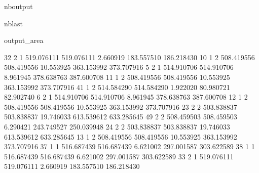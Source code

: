 \documentclass[letterpaper,10pt,english]{sphinxmanual}
\begin{document}
\begin{sphinxuseclass}{nboutput}
\begin{sphinxuseclass}{nblast}
{\begin{sphinxuseclass}{output_area}
\begin{sphinxuseclass}{}
\begin{sphinxVerbatim}[commandchars=\\\{\}]
32   2   1  519.076111  519.076111    2.660919  183.557510  186.218430
10   1   2  508.419556  508.419556   10.553925  363.153992  373.707916
5    2   1  514.910706  514.910706    8.961945  378.638763  387.600708
11   1   2  508.419556  508.419556   10.553925  363.153992  373.707916
41   1   2  514.584290  514.584290    1.922020   80.980721   82.902740
6    2   1  514.910706  514.910706    8.961945  378.638763  387.600708
12   1   2  508.419556  508.419556   10.553925  363.153992  373.707916
23   2   2  503.838837  503.838837   19.746033  613.539612  633.285645
49   2   2  508.459503  508.459503    6.290421  243.749527  250.039948
24   2   2  503.838837  503.838837   19.746033  613.539612  633.285645
13   1   2  508.419556  508.419556   10.553925  363.153992  373.707916
37   1   1  516.687439  516.687439    6.621002  297.001587  303.622589
38   1   1  516.687439  516.687439    6.621002  297.001587  303.622589
33   2   1  519.076111  519.076111    2.660919  183.557510  186.218430


\end{sphinxVerbatim}
\end{sphinxuseclass}
\end{sphinxuseclass}}
\end{sphinxuseclass}
\end{sphinxuseclass}
\end{document}
